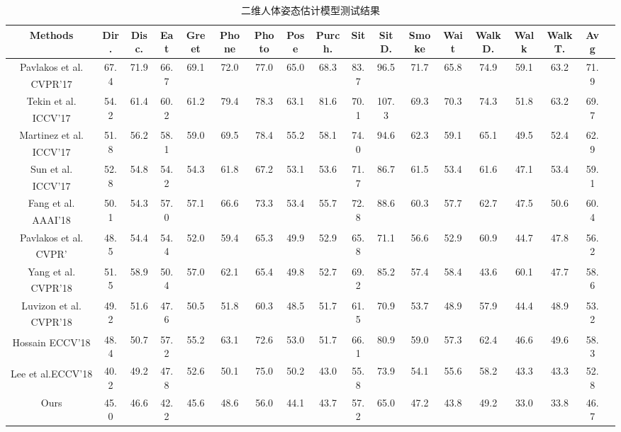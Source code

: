 \begin{table}[h]
    \caption{\label{tab:t3}二维人体姿态估计模型测试结果}
    \centering
    \begin{tabular}{c c c c c c c c c c c c c c c c c c}
        \toprule
		Methods  & Dir.   & Disc. & Eat   & Greet  & Phone  & Photo  & Pose  & Purch.  & Sit  & SitD.  & Smoke  & Wait  & WalkD.  & Walk  & WalkT.  & Avg   \\
        \midrule
        Pavlakos et al. CVPR’17\textsuperscript{\cite{p1}}     & 67.4  & 71.9  & 66.7  & 69.1  & 72.0  & 77.0  & 65.0  & 68.3  & 83.7  & 96.5  & 71.7  & 65.8  & 74.9  & 59.1  & 63.2  & 71.9  \\
		Tekin et al. ICCV’17\textsuperscript{\cite{p2}}        & 54.2  & 61.4  & 60.2  & 61.2  & 79.4  & 78.3  & 63.1  & 81.6  & 70.1  & 107.3 & 69.3  & 70.3  & 74.3  & 51.8  & 63.2  & 69.7  \\
		Martinez et al. ICCV’17\textsuperscript{\cite{p30}}    & 51.8  & 56.2  & 58.1  & 59.0  & 69.5  & 78.4  & 55.2  & 58.1  & 74.0  & 94.6  & 62.3  & 59.1  & 65.1  & 49.5  & 52.4  & 62.9  \\
		Sun et al. ICCV’17\textsuperscript{\cite{p3}}          & 52.8  & 54.8  & 54.2  & 54.3  & 61.8  & 67.2  & 53.1  & 53.6  & 71.7  & 86.7  & 61.5  & 53.4  & 61.6  & 47.1  & 53.4  & 59.1  \\
		Fang et al. AAAI’18\textsuperscript{\cite{p4}}         & 50.1  & 54.3  & 57.0  & 57.1  & 66.6  & 73.3  & 53.4  & 55.7  & 72.8  & 88.6  & 60.3  & 57.7  & 62.7  & 47.5  & 50.6  & 60.4  \\
		Pavlakos et al. CVPR’\textsuperscript{\cite{p5}}       & 48.5  & 54.4  & 54.4  & 52.0  & 59.4  & 65.3  & 49.9  & 52.9  & 65.8  & 71.1  & 56.6  & 52.9  & 60.9  & 44.7  & 47.8  & 56.2  \\
		Yang et al. CVPR’18\textsuperscript{\cite{p6}}         & 51.5  & 58.9  & 50.4  & 57.0  & 62.1  & 65.4  & 49.8  & 52.7  & 69.2  & 85.2  & 57.4  & 58.4  & 43.6  & 60.1  & 47.7  & 58.6  \\
		Luvizon et al. CVPR’18\textsuperscript{\cite{p7}}      & 49.2  & 51.6  & 47.6  & 50.5  & 51.8  & 60.3  & 48.5  & 51.7  & 61.5  & 70.9  & 53.7  & 48.9  & 57.9  & 44.4  & 48.9  & 53.2  \\
		Hossain  ECCV’18\textsuperscript{\cite{p8}}            & 48.4  & 50.7  & 57.2  & 55.2  & 63.1  & 72.6  & 53.0  & 51.7  & 66.1  & 80.9  & 59.0  & 57.3  & 62.4  & 46.6  & 49.6  & 58.3  \\
        Lee et al.ECCV’18\textsuperscript{\cite{p11}}  	       & 40.2  & 49.2  & 47.8  & 52.6  & 50.1  & 75.0  & 50.2  & 43.0  & 55.8  & 73.9  & 54.1  & 55.6  & 58.2  & 43.3  & 43.3  & 52.8 \\
		Ours                                                   & 45.0  & 46.6  & 42.2  & 45.6  & 48.6  & 56.0  & 44.1  & 43.7  & 57.2  & 65.0  & 47.2  & 43.8  & 49.2  & 33.0  & 33.8  & 46.7  \\
		\bottomrule
    \end{tabular}
\end{table}


